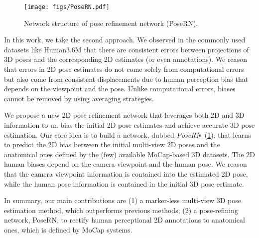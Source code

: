 \documentclass{article}
\begin{document}
\begin{figure}[t]
  \centering
  \texttt{[image: figs/PoseRN.pdf]}
  \vspace{-0.3cm}
  \caption{Network structure of pose refinement network (PoseRN).}
  \label{fig:PoseRN}
  \vspace{-0.3cm}
\end{figure}

In this work, we take the second approach. We observed in the commonly used datasets like Human3.6M \cite{ionescu2013human3} that there are consistent errors between projections of 3D poses and the corresponding 2D estimates (or even annotations).
We reason that errors in 2D pose estimates do not come solely from computational errors but also come from consistent displacements due to human perception bias that depends on the viewpoint and the pose. Unlike computational errors, biases cannot be removed by using averaging strategies. 

We propose a new 2D pose refinement network that leverages both 2D and 3D information to un-bias the initial 2D pose estimates and achieve accurate 3D pose estimation. Our core idea is to build a network, dubbed \textit{PoseRN}~(\ref{fig:PoseRN}), that learns to predict the 2D bias between the initial multi-view 2D poses and the anatomical ones defined by the (few) available MoCap-based 3D datasets. The 2D human biases depend on the camera viewpoint and the human pose. We reason that the camera viewpoint information is contained into the estimated 2D pose, while the human pose information is contained in the initial 3D pose estimate. 

In summary, our main contributions are (1) a marker-less multi-view 3D pose estimation method, which outperforms previous methods; (2) a pose-refining network, PoseRN, to rectify human perceptional 2D annotations to anatomical ones, which is defined by MoCap systems.
\end{document}
